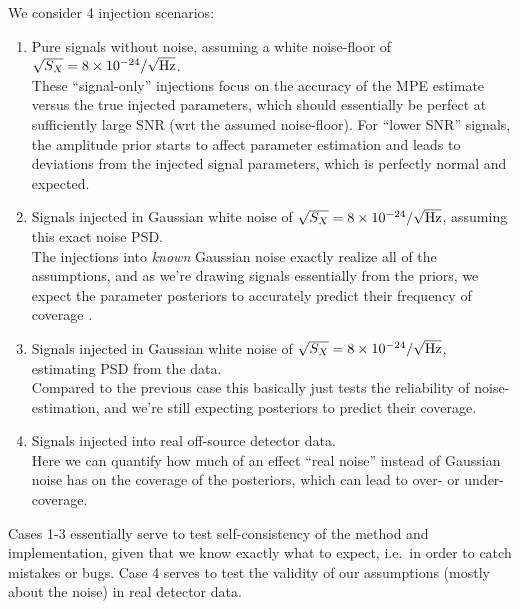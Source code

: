 \documentclass[aps,prd,onecolumn,notitlepage,nofootinbib,superscriptaddress,altaffilletter,floatfix]{revtex4-1}
\begin{document}
We consider 4 injection scenarios:
\begin{enumerate}

\item Pure signals without noise, assuming a white noise-floor of $\sqrt{S_X} = 8\times10^{-24}/\sqrt{\mathrm{Hz}}$.\\[0.2cm]
  These ``signal-only'' injections focus on the accuracy of the MPE estimate versus the true injected parameters, which should essentially be
  perfect at sufficiently large SNR (wrt the assumed noise-floor). For ``lower SNR'' signals, the amplitude prior starts to affect parameter estimation
  and leads to deviations from the injected signal parameters, which is perfectly normal and expected.

\item Signals injected in Gaussian white noise of $\sqrt{S_X} = 8\times10^{-24}/\sqrt{\mathrm{Hz}}$, assuming this exact noise PSD.\\[0.2cm]
  The injections into \emph{known} Gaussian noise exactly realize all of the assumptions, and as we're drawing signals essentially from the
  priors, we expect the parameter posteriors to accurately predict their frequency of coverage \citep[e.g.\ see][]{2008arXiv0804.1161S}.

\item Signals injected in Gaussian white noise of $\sqrt{S_X} = 8\times10^{-24}/\sqrt{\mathrm{Hz}}$, estimating PSD from the data.\\[0.2cm]
  Compared to the previous case this basically just tests the reliability of noise-estimation, and we're still expecting posteriors to predict their
  coverage.

\item Signals injected into real off-source detector data.\\[0.2cm]
  Here we can quantify how much of an effect ``real noise'' instead of Gaussian noise has on the coverage of the posteriors, which can lead to over-
  or under-coverage.

\end{enumerate}

Cases 1-3 essentially serve to test self-consistency of the method and implementation, given that we know exactly what to expect, i.e.\ in order to
catch mistakes or bugs. Case 4 serves to test the validity of our assumptions (mostly about the noise) in real detector data.
\end{document}
